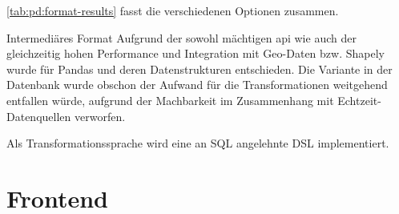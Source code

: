 \cref{tab:pd:format-results} fasst die verschiedenen Optionen zusammen.

\begin{decision}[label=dec:pd:format]{Intermediäres Format}
Aufgrund der sowohl mächtigen \acs{api} wie auch der gleichzeitig hohen Performance und Integration mit Geo-Daten bzw. Shapely wurde für Pandas und deren Datenstrukturen entschieden. Die Variante in der Datenbank wurde obschon der Aufwand für die Transformationen weitgehend entfallen würde, aufgrund der Machbarkeit im Zusammenhang mit Echtzeit-Datenquellen verworfen.

Als Transformationssprache wird eine an SQL angelehnte DSL implementiert.
\end{decision}

\section{Frontend}
